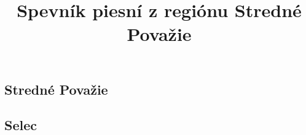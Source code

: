 \documentclass[a4paper]{book}
\title{Spevník piesní z regiónu Stredné Považie}
\begin{document}
\maketitle
\begin{center}

\chapter*{Stredné Považie}
\section*{Selec}
{%
\parindent 0pt
\noindent
\ifx\preLilyPondExample \undefined
\else
  \expandafter\preLilyPondExample
\fi
\def\lilypondbook{}%

\ifx\postLilyPondExample \undefined
\else
  \expandafter\postLilyPondExample
\fi
}
{%
\parindent 0pt
\noindent
\ifx\preLilyPondExample \undefined
\else
  \expandafter\preLilyPondExample
\fi
\def\lilypondbook{}%

\ifx\postLilyPondExample \undefined
\else
  \expandafter\postLilyPondExample
\fi
}
{%
\parindent 0pt
\noindent
\ifx\preLilyPondExample \undefined
\else
  \expandafter\preLilyPondExample
\fi
\def\lilypondbook{}%

\ifx\postLilyPondExample \undefined
\else
  \expandafter\postLilyPondExample
\fi
}
{%
\parindent 0pt
\noindent
\ifx\preLilyPondExample \undefined
\else
  \expandafter\preLilyPondExample
\fi
\def\lilypondbook{}%

\ifx\postLilyPondExample \undefined
\else
  \expandafter\postLilyPondExample
\fi
}
{%
\parindent 0pt
\noindent
\ifx\preLilyPondExample \undefined
\else
  \expandafter\preLilyPondExample
\fi
\def\lilypondbook{}%

\ifx\postLilyPondExample \undefined
\else
  \expandafter\postLilyPondExample
\fi
}


\end{center}
\end{document}
